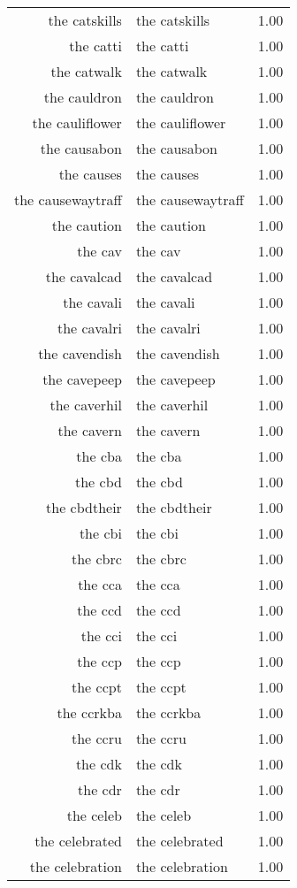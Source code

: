 \begin{table}[ht]
\begin{tabular}{rlr}
  the catskills & the catskills & 1.00 \\ 
  the catti & the catti & 1.00 \\ 
  the catwalk & the catwalk & 1.00 \\ 
  the cauldron & the cauldron & 1.00 \\ 
  the cauliflower & the cauliflower & 1.00 \\ 
  the causabon & the causabon & 1.00 \\ 
  the causes & the causes & 1.00 \\ 
  the causewaytraff & the causewaytraff & 1.00 \\ 
  the caution & the caution & 1.00 \\ 
  the cav & the cav & 1.00 \\ 
  the cavalcad & the cavalcad & 1.00 \\ 
  the cavali & the cavali & 1.00 \\ 
  the cavalri & the cavalri & 1.00 \\ 
  the cavendish & the cavendish & 1.00 \\ 
  the cavepeep & the cavepeep & 1.00 \\ 
  the caverhil & the caverhil & 1.00 \\ 
  the cavern & the cavern & 1.00 \\ 
  the cba & the cba & 1.00 \\ 
  the cbd & the cbd & 1.00 \\ 
  the cbdtheir & the cbdtheir & 1.00 \\ 
  the cbi & the cbi & 1.00 \\ 
  the cbrc & the cbrc & 1.00 \\ 
  the cca & the cca & 1.00 \\ 
  the ccd & the ccd & 1.00 \\ 
  the cci & the cci & 1.00 \\ 
  the ccp & the ccp & 1.00 \\ 
  the ccpt & the ccpt & 1.00 \\ 
  the ccrkba & the ccrkba & 1.00 \\ 
  the ccru & the ccru & 1.00 \\ 
  the cdk & the cdk & 1.00 \\ 
  the cdr & the cdr & 1.00 \\ 
  the celeb & the celeb & 1.00 \\ 
  the celebrated & the celebrated & 1.00 \\ 
  the celebration & the celebration & 1.00 \\ 

\end{tabular}
\end{table}
